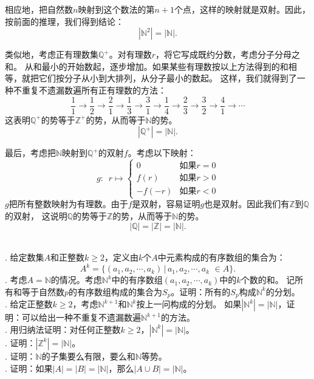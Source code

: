 \documentclass[12pt,UTF8]{ctexbook}
\begin{document}
相应地，把自然数$n$映射到这个数法的第$n+1$个点，这样的映射就是双射。因此，按前面的推理，我们得到结论：
$$ |\mathbb{N}^2| = |\mathbb{N}|.$$

类似地，考虑正有理数集$\mathbb{Q}^+$。对有理数$r$，将它写成既约分数，考虑分子分母之和。
从和最小的开始数起，逐步增加。如果某些有理数按以上方法得到的和相等，就把它们按分子从小到大排列，从分子最小的数起。
这样，我们就得到了一种不重复不遗漏数遍所有正有理数的方法：
$$ \frac{1}{1} \rightarrow \frac{1}{2} \rightarrow \frac{2}{1} \rightarrow \frac{1}{3} \rightarrow \frac{3}{1} \rightarrow \frac{1}{4} \rightarrow \frac{2}{3} \rightarrow \frac{3}{2} \rightarrow \frac{4}{1} \rightarrow \cdots$$
这表明$\mathbb{Q}^+$的势等于$\mathbb{Z}^+$的势，从而等于$\mathbb{N}$的势。
$$ |\mathbb{Q}^+| = |\mathbb{N}|.$$

最后，考虑把$\mathbb{N}$映射到$\mathbb{Q}^+$的双射$f$。考虑以下映射：
$$ g:\,\,\,r\mapsto \left\{
    \begin{array}{cl}
        0 & \mbox{如果}r = 0 \\
        f(r) & \mbox{如果}r > 0 \\
        -f(-r)  & \mbox{如果}r < 0 
    \end{array}\right.
$$
$g$把所有整数映射为有理数。由于$f$是双射，容易证明$g$也是双射。因此我们有$\mathbb{Z}$到$\mathbb{Q}$的双射，
这说明$\mathbb{Q}$的势等于$\mathbb{Z}$的势，从而等于$\mathbb{N}$的势。
$$ |\mathbb{Q}| = |\mathbb{Z}| = |\mathbb{N}|.$$



\begin{xt}
    \mbox{} \\
    . 给定数集$A$和正整数$k\geqslant 2$，定义由$k$个$A$中元素构成的有序数组的集合为：
    $$ A^k = \{(a_1, a_2, \cdots, a_k) \, | \, a_1, a_2, \cdots, a_k \,\, \in A \}.$$
    . 考虑$A = \mathbb{N}$的情况。考虑$\mathbb{N}^k$中的有序数组$(a_1, a_2, \cdots, a_k)$中的$k$个数的和。
    记所有和等于自然数$p$的有序数组构成的集合为$S_p$。证明：所有的$S_p$构成$\mathbb{N}^k$的分划。\\
    . 给定正整数$k\geqslant 2$，考虑$\mathbb{N}^{k+1}$和$\mathbb{N}^{k}$按上一问构成的分划。
    如果$|\mathbb{N}^k| = |\mathbb{N}|$，证明：可以给出一种不重复不遗漏数遍$\mathbb{N}^{k+1}$的方法。\\
    . 用归纳法证明：对任何正整数$k\geqslant 2$，$|\mathbb{N}^k| = |\mathbb{N}|$。\\
    . 证明：$|\mathbb{Z}^k| = |\mathbb{N}|$。\\
    . 证明：$\mathbb{N}$的子集要么有限，要么和$\mathbb{N}$等势。\\
    . 证明：如果$|A| = |B| = |\mathbb{N}|$，那么$|A\cup B| = |\mathbb{N}|$。
\end{xt}
\end{document}
